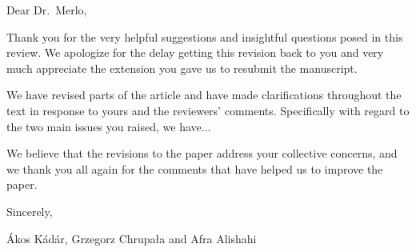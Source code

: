 \newpage
{}

\noindent
Dear Dr.~Merlo,
\newline

Thank you for the very helpful suggestions and insightful questions
posed in this review.  We apologize for the delay getting this
revision back to you and very much appreciate the extension you 
gave us to resubmit the manuscript.

We have revised parts of the article and have made clarifications
throughout the text in response to yours and the reviewers' comments.
Specifically with regard to the two main issues you raised, we have...


We believe that the revisions to the paper address your collective
concerns, and we thank you all again for the comments that have helped
us to improve the paper.
\newline

\noindent
Sincerely,
\newline

\noindent
Ákos Kádár, Grzegorz Chrupała and Afra Alishahi
\newline


